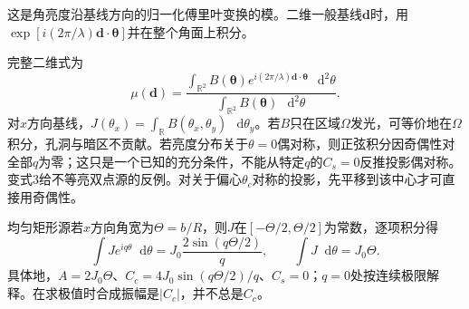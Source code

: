 \documentclass[UTF8,fontset=fandol,a4paper,11pt]{ctexart}
\newcommand{\dd}{\mathop{}\!\mathrm{d}}
\begin{document}
这是角亮度沿基线方向的归一化傅里叶变换的模。二维一般基线$\boldsymbol d$时，用$\exp[i(2\pi/\lambda)\boldsymbol d\cdot\boldsymbol\theta]$并在整个角面上积分。

完整二维式为
\[
\mu(\boldsymbol d)=
\frac{\int_{\mathbb R^2}B(\boldsymbol\theta)
 e^{i(2\pi/\lambda)\boldsymbol d\cdot\boldsymbol\theta}\,\dd^2\theta}
{\int_{\mathbb R^2}B(\boldsymbol\theta)\,\dd^2\theta}.
\]
对$x$方向基线，$J(\theta_x)=\int_{\mathbb R}B(\theta_x,\theta_y)\,\dd\theta_y$。若$B$只在区域$\Omega$发光，可等价地在$\Omega$积分，孔洞与暗区不贡献。若亮度分布关于$\theta=0$偶对称，则正弦积分因奇偶性对全部$q$为零；这只是一个已知的充分条件，不能从特定$q$的$C_s=0$反推投影偶对称。变式3给不等亮双点源的反例。对关于偏心$\theta_c$对称的投影，先平移到该中心才可直接用奇偶性。

均匀矩形源若$x$方向角宽为$\Theta=b/R$，则$J$在$[-\Theta/2,\Theta/2]$为常数，逐项积分得
\[
\int J e^{iq\theta}\dd\theta
=J_0\frac{2\sin(q\Theta/2)}q,\qquad
\int J\dd\theta=J_0\Theta.
\]
具体地，$A=2J_0\Theta$、$C_c=4J_0\sin(q\Theta/2)/q$、$C_s=0$；$q=0$处按连续极限解释。在求极值时合成振幅是$|C_c|$，并不总是$C_c$。
\end{document}
